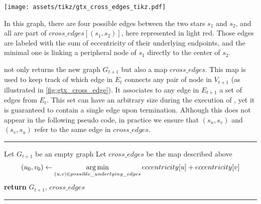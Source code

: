 \begin{marginfigure}
  \centering
  \texttt{[image: assets/tikz/gtx\_cross\_edges\_tikz.pdf]}
  \caption[Cross edge representation]{In this graph, there are four possible edges between the two
  stars $s_1$ and $s_2$, and all are part of $cross\_edges[(s_1, s_2)]$, here represented in light
red. Those edges are labeled with the sum of eccentricity of their underlying endpoints, and the
minimal one is linking a peripheral node of $s_1$ directly to the center of $s_2$.}
  \label{fig:gtx_cross_edge}
\end{marginfigure}%
\collapseStar{} not only returns the new graph $G_{t+1}$ but also a map $cross\_edges$. This map is
used to keep track of which edge in $E_t$ connects any pair of node in $V_{t+1}$ (as illustrated in
\autoref{fig:gtx_cross_edge}). It associates to any edge in $E_{t+1}$ a set of edges from $E_t$.
This set can have an arbitrary size during the execution of \collapseStar{}, yet it is guaranteed to
contain a single edge upon termination. Although this does not appear in the following pseudo code,
in practice we ensure that $(s_u, s_v)$ and $(s_v, s_u)$ refer to the same edge in $cross\_edges$.

\begin{center}
  \rule{\textwidth}{.3pt}
  \begin{algorithmic}[1]
      \State Let $G_{t+1}$ be an empty graph
      \State Let $cross\_edges$ be the map described above
        \EndIf
      \EndFor
        \State $$(u_0, v_0) \gets \operatorname*{arg\,min}_{(u,v)\in possible\_underlying\_edges} eccentricity[u]+eccentricity[v]$$
      \EndFor
      \State \textbf{return} $G_{t+1}$, $cross\_edges$
    \EndFunction
  \end{algorithmic}
  \rule{\textwidth}{.3pt}
\end{center}

